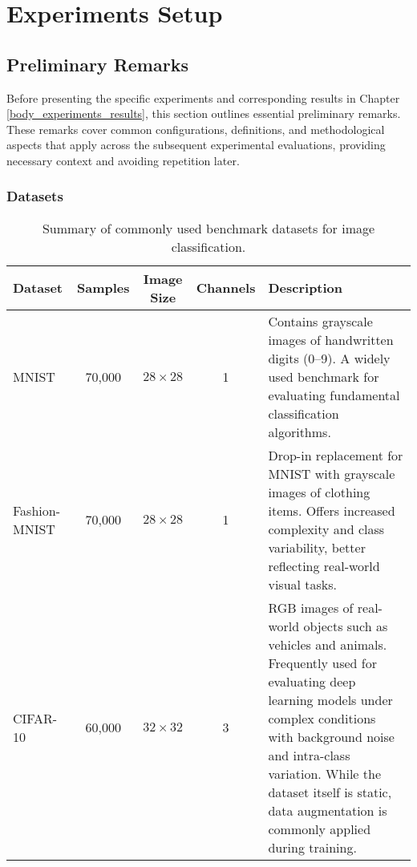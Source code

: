 \section{Experiments Setup}\label{body_experiments_setup}

\subsection{Preliminary Remarks}\label{body_prelim}
Before presenting the specific experiments and corresponding results in Chapter \ref{body_experiments_results}, this section outlines essential preliminary remarks. These remarks cover common configurations, definitions, and methodological aspects that apply across the subsequent experimental evaluations, providing necessary context and avoiding repetition later.


\subsubsection{Datasets}

\begin{table}[H]
    \centering
    \vspace{-1.5em}
    \caption{Summary of commonly used benchmark datasets for image classification.}
    \label{tab:dataset_summary}
    \begin{tabular}{|p{1.8cm}|c|c|c|p{6cm}|} %
        \hline
        \textbf{Dataset} & \textbf{Samples} & \textbf{Image Size} & \textbf{Channels} & \textbf{Description} \\
        \hline
        MNIST & 70,000 & $28 \times 28$ & 1 & Contains grayscale images of handwritten digits (0–9). A widely used benchmark for evaluating fundamental classification algorithms. \\
        \hline
        Fashion-MNIST & 70,000 & $28 \times 28$ & 1 & Drop-in replacement for MNIST with grayscale images of clothing items. Offers increased complexity and class variability, better reflecting real-world visual tasks. \\
        \hline
        CIFAR-10 & 60,000 & $32 \times 32$ & 3 & RGB images of real-world objects such as vehicles and animals. Frequently used for evaluating deep learning models under complex conditions with background noise and intra-class variation. While the dataset itself is static, data augmentation is commonly applied during training. \\
        \hline
    \end{tabular}
\end{table}



